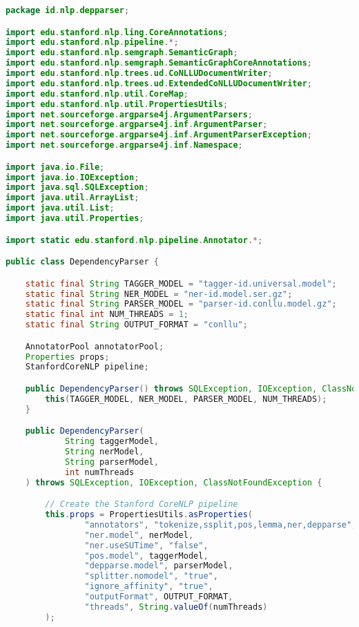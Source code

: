 \begin{lstlisting}[language=Java]
package id.nlp.depparser;

import edu.stanford.nlp.ling.CoreAnnotations;
import edu.stanford.nlp.pipeline.*;
import edu.stanford.nlp.semgraph.SemanticGraph;
import edu.stanford.nlp.semgraph.SemanticGraphCoreAnnotations;
import edu.stanford.nlp.trees.ud.CoNLLUDocumentWriter;
import edu.stanford.nlp.trees.ud.ExtendedCoNLLUDocumentWriter;
import edu.stanford.nlp.util.CoreMap;
import edu.stanford.nlp.util.PropertiesUtils;
import net.sourceforge.argparse4j.ArgumentParsers;
import net.sourceforge.argparse4j.inf.ArgumentParser;
import net.sourceforge.argparse4j.inf.ArgumentParserException;
import net.sourceforge.argparse4j.inf.Namespace;

import java.io.File;
import java.io.IOException;
import java.sql.SQLException;
import java.util.ArrayList;
import java.util.List;
import java.util.Properties;

import static edu.stanford.nlp.pipeline.Annotator.*;

public class DependencyParser {

    static final String TAGGER_MODEL = "tagger-id.universal.model";
    static final String NER_MODEL = "ner-id.model.ser.gz";
    static final String PARSER_MODEL = "parser-id.conllu.model.gz";
    static final int NUM_THREADS = 1;
    static final String OUTPUT_FORMAT = "conllu";

    AnnotatorPool annotatorPool;
    Properties props;
    StanfordCoreNLP pipeline;

    public DependencyParser() throws SQLException, IOException, ClassNotFoundException {
        this(TAGGER_MODEL, NER_MODEL, PARSER_MODEL, NUM_THREADS);
    }

    public DependencyParser(
            String taggerModel,
            String nerModel,
            String parserModel,
            int numThreads
    ) throws SQLException, IOException, ClassNotFoundException {

        // Create the Stanford CoreNLP pipeline
        this.props = PropertiesUtils.asProperties(
                "annotators", "tokenize,ssplit,pos,lemma,ner,depparse",
                "ner.model", nerModel,
                "ner.useSUTime", "false",
                "pos.model", taggerModel,
                "depparse.model", parserModel,
                "splitter.nomodel", "true",
                "ignore_affinity", "true",
                "outputFormat", OUTPUT_FORMAT,
                "threads", String.valueOf(numThreads)
        );


\end{lstlisting}

